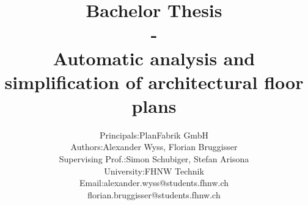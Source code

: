 \documentclass[11pt, a4paper]{report}
\begin{document}
	\title{\textbf{Bachelor Thesis \\ - \\Automatic analysis and simplification of architectural floor plans}}
	\author{
			\begin{tabular}{l  l}
				Principals: & PlanFabrik GmbH \\
				Authors: & Alexander Wyss, Florian Bruggisser \\
				Supervising Prof.: & Simon Schubiger, Stefan Arisona \\ University: & FHNW Technik \\
				Email: & alexander.wyss@students.fhnw.ch \\ & florian.bruggisser@students.fhnw.ch				
			\end{tabular}
	}
	
\maketitle



\tableofcontents
	








	



\clearpage
\printglossary

\clearpage
\listoffigures
\end{document}
